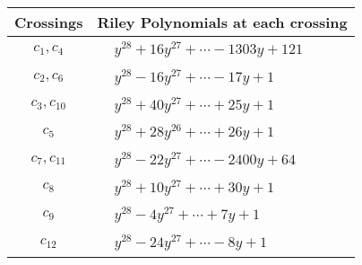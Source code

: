 \documentclass[1p]{elsarticle_modified}
\theoremstyle{definition}
\begin{document}
\begin{tabular}{m{50pt}|m{274pt}}
Crossings & \hspace{64pt}Riley Polynomials at each crossing \\
\hline $$\begin{aligned}c_{1},c_{4}\end{aligned}$$&$\begin{aligned}
&y^{28}+16 y^{27}+\cdots-1303 y+121
\end{aligned}$\\
\hline $$\begin{aligned}c_{2},c_{6}\end{aligned}$$&$\begin{aligned}
&y^{28}-16 y^{27}+\cdots-17 y+1
\end{aligned}$\\
\hline $$\begin{aligned}c_{3},c_{10}\end{aligned}$$&$\begin{aligned}
&y^{28}+40 y^{27}+\cdots+25 y+1
\end{aligned}$\\
\hline $$\begin{aligned}c_{5}\end{aligned}$$&$\begin{aligned}
&y^{28}+28 y^{26}+\cdots+26 y+1
\end{aligned}$\\
\hline $$\begin{aligned}c_{7},c_{11}\end{aligned}$$&$\begin{aligned}
&y^{28}-22 y^{27}+\cdots-2400 y+64
\end{aligned}$\\
\hline $$\begin{aligned}c_{8}\end{aligned}$$&$\begin{aligned}
&y^{28}+10 y^{27}+\cdots+30 y+1
\end{aligned}$\\
\hline $$\begin{aligned}c_{9}\end{aligned}$$&$\begin{aligned}
&y^{28}-4 y^{27}+\cdots+7 y+1
\end{aligned}$\\
\hline $$\begin{aligned}c_{12}\end{aligned}$$&$\begin{aligned}
&y^{28}-24 y^{27}+\cdots-8 y+1
\end{aligned}$\\
\hline
\end{tabular}\\~\\
\end{document}

